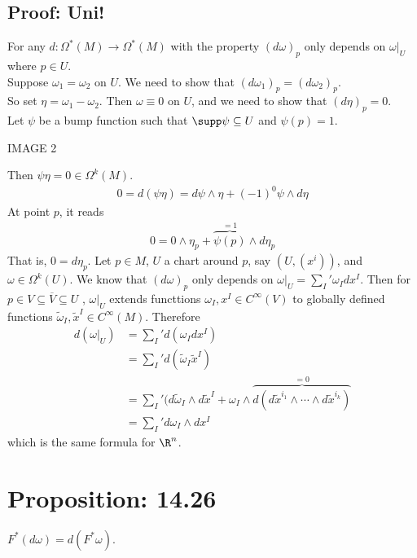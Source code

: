 \documentclass[11pt]{article}
\begin{document}
\subsection*{Proof: Uni!}
\label{sec:org9713723}
For any \(d:\Omega^{*}(M)\to\Omega^{*}(M)\) with the property \((d\omega)_{p}\) only depends on \(\omega|_{U}\) where \(p\in U\).\\
Suppose \(\omega_{1}=\omega_{2}\) on \(U\). We need to show that \((d\omega_{1})_{p}=(d\omega_{2})_{p}\).\\
So set \(\eta=\omega_{1}-\omega_{2}\). Then \(\omega\equiv 0\) on \(U\), and we need to show that \((d\eta)_{p}=0\).\\
Let \(\psi\) be a bump function such that \(\supp\psi\subseteq U\) and \(\psi(p)=1\).\\
\begin{center}
IMAGE 2\\
\end{center}
Then \(\psi\eta=0\in\Omega^{k}(M)\).\\
\begin{align*}
  0=d(\psi\eta)=d\psi\wedge\eta+(-1)^{0}\psi\wedge d\eta
\end{align*}
At point \(p\), it reads\\
\begin{align*}
  0=0\wedge\eta_{p}+\overbrace{\psi(p)}^{=1}\wedge d\eta_{p}
\end{align*}
That is, \(0=d\eta_{p}\). Let \(p\in M\), \(U\) a chart around \(p\), say \((U,(x^{i}))\), and \(\omega\in\Omega^{k}(U)\). We know that \((d\omega)_{p}\) only depends on \(\omega|_{U}=\sum_{I}'\omega_{I}dx^{I}\). Then for \(p\in V\subseteq\overline{V}\subseteq U\) , \(\omega|_{U}\) extends functtions \(\omega_{I},x^{I}\in C^{\infty}(V)\) to globally defined functions \(\tilde{\omega}_{I},\tilde{x}^{I}\in C^{\infty}(M)\). Therefore\\
\begin{align*}
  d(\omega|_{U})
  &=\sum_{I}'d(\omega_{I}dx^{I}) \\
  &=\sum_{I}'d(\tilde{\omega}_{I}\tilde{x}^{I}) \\
  &=\sum_{I}'(d\tilde{\omega}_{I}\wedge d\tilde{x}^{I}+\omega_{I}\wedge \overbrace{d(d\tilde{x}^{i_{1}}\wedge\cdots\wedge d\tilde{x}^{i_{k}})}^{=0} \\
  &=\sum_{I}'d\omega_{I}\wedge dx^{I}
\end{align*}
which is the same formula for \(\R^{n}\).\\
\section*{Proposition: 14.26}
\label{sec:orgd841b1d}
\(F^{*}(d\omega)=d(F^{*}\omega)\).\\
\end{document}
